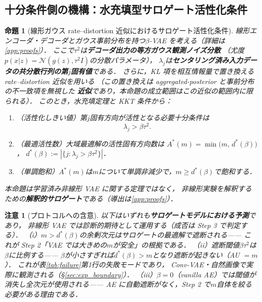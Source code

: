 \documentclass[11pt,a4paper]{jsarticle}
\newtheorem{proposition}{命題}
\newtheorem{remark}{注意}
\newcommand{\dstar}{d^{*}(\beta)}
\begin{document}
\subsection{十分条件側の機構：水充填型サロゲート活性化条件}\label{sec:theory_wf}

\begin{proposition}[線形ガウス rate--distortion 近似におけるサロゲート活性化条件]\label{thm:linear_vae}
線形エンコーダ・デコーダとガウス事前分布を持つ$\beta$-VAE を考える（詳細は\ref{app:proofs}）．
ここで$\tau^2$は\textbf{デコーダ出力の等方ガウス観測ノイズ分散}
（尤度$p(x|z) = \mathcal{N}(g(z), \tau^2 I)$の分散パラメータ），
$\lambda_j$は\textbf{センタリング済み入力データの共分散行列の第$j$固有値}である．
さらに，KL 項を相互情報量で置き換える rate--distortion 近似を用いる
（この置き換えは aggregated-posterior と事前分布の不一致項を無視した
\textbf{近似}であり，本命題の成立範囲はこの近似の範囲内に限られる）．
このとき，水充填定理と KKT 条件から：
\begin{enumerate}
  \item （活性化しきい値）第$j$固有方向が活性となる必要十分条件は
        \begin{equation}
          \lambda_j > \beta \tau^2 .
          \label{eq:au_threshold}
        \end{equation}
  \item （最適活性数）大域最適解の活性固有方向数は
        $A^*(m) = \min\bigl(m,\, \dstar\bigr)$，
        $\dstar := |\{j : \lambda_j > \beta\tau^2\}|$．
  \item （単調飽和）$A^*(m)$は$m$について単調非減少で，$m \geq \dstar$で飽和する．
\end{enumerate}
本命題は学習済み非線形 VAE に関する定理ではなく，
非線形実験を解釈するための\textbf{解釈的サロゲート}である（導出は\ref{app:proofs}）．
\end{proposition}

\begin{remark}[プロトコルへの含意]\label{rem:implication}
以下はいずれも\textbf{サロゲートモデルにおける予測}であり，
非線形 VAE では診断的期待として運用する（成否は Step 3 で判定する）．
（i）$m > \dstar$の余剰次元はサロゲートの最適解で遮断される——
これが Step 2「VAE では大きめの$m$が安全」の根拠である．
（ii）遮断閾値$\beta\tau^2$は$\beta$に比例する——
$\beta$が小さすぎれば$\dstar > m$となり遮断が起きない（AU $= m$）．
これが表\ref{tab:failure}第1行の失敗モードであり，
Conv-VAE・自然画像で実際に観測される（§\ref{sec:exp_boundary}）．
（iii）$\beta = 0$（vanilla AE）では閾値が消失し全次元が使用される——
AE に自動遮断がなく，Step 2 で$m$自体を絞る必要がある理由である．
\end{remark}
\end{document}
